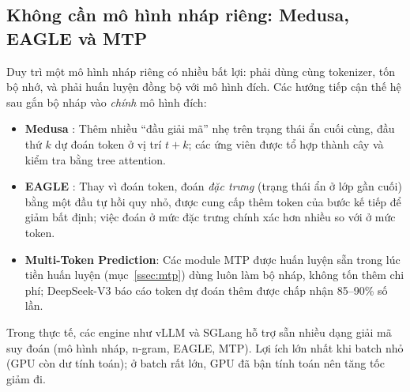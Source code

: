 \subsection{Không cần mô hình nháp riêng: Medusa, EAGLE và MTP}
\label{ssec:draft_free}
Duy trì một mô hình nháp riêng có nhiều bất lợi: phải dùng cùng tokenizer, tốn bộ nhớ, và phải huấn luyện đồng bộ với mô hình đích. Các hướng tiếp cận thế hệ sau gắn bộ nháp vào \emph{chính} mô hình đích:
\begin{itemize}
	\item \textbf{Medusa} \cite{cai2024medusa}: Thêm nhiều “đầu giải mã” nhẹ trên trạng thái ẩn cuối cùng, đầu thứ $k$ dự đoán token ở vị trí $t+k$; các ứng viên được tổ hợp thành cây và kiểm tra bằng tree attention.
	\item \textbf{EAGLE} \cite{li2024eagle}: Thay vì đoán token, đoán \emph{đặc trưng} (trạng thái ẩn ở lớp gần cuối) bằng một đầu tự hồi quy nhỏ, được cung cấp thêm token của bước kế tiếp để giảm bất định; việc đoán ở mức đặc trưng chính xác hơn nhiều so với ở mức token.
	\item \textbf{Multi-Token Prediction}: Các module MTP được huấn luyện sẵn trong lúc tiền huấn luyện (mục~\ref{ssec:mtp}) dùng luôn làm bộ nháp, không tốn thêm chi phí; DeepSeek-V3 báo cáo token dự đoán thêm được chấp nhận 85--90\% số lần.
\end{itemize}
Trong thực tế, các engine như vLLM và SGLang hỗ trợ sẵn nhiều dạng giải mã suy đoán (mô hình nháp, n-gram, EAGLE, MTP). Lợi ích lớn nhất khi batch nhỏ (GPU còn dư tính toán); ở batch rất lớn, GPU đã bận tính toán nên tăng tốc giảm đi.
